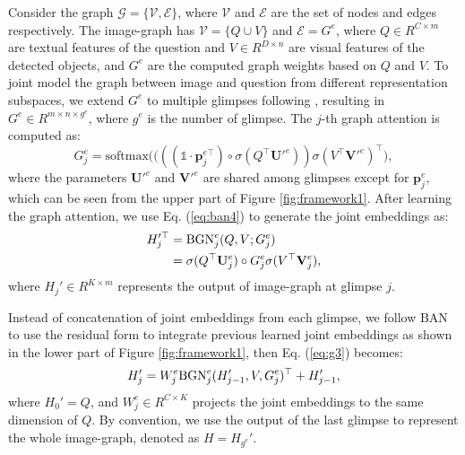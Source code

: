 \documentclass[10pt,twocolumn,letterpaper]{article}
\begin{document}
Consider the graph $\mathcal{G} = \{\mathcal{V}, \mathcal{E}\}$, where $\mathcal{V}$ and $\mathcal{E}$ are the set of nodes and edges respectively. The image-graph has $\mathcal{V}=\{Q \cup V\}$ and $\mathcal{E}=G^{e}$, where $Q \in R^{C \times m}$ are textual features of the question and $V \in R^{D \times n}$ are visual features of the detected objects, and $G^{e} $ are the computed graph weights based on $Q$ and $V$. To joint model the graph between image and question from different representation subspaces, we extend $G^{e}$ to multiple glimpses following \cite{kim2018bilinear, vaswani2017attention}, resulting in $G^{e} \in R^{m \times n \times g^e}$, where $g^e$ is the number of glimpse. The $j$-th graph attention is computed as:
\vspace{-5pt}
{\small
\begin{equation} \label{eq:g2}
G_{j}^{e} =\mathrm{softmax}\Big((((\mathds{1} \cdot \mathbf{p}_{j}^{e\top}) \circ \sigma(Q^\top\mathbf{U'}^{e})) \sigma(V^\top \mathbf{V'}^e)^\top \Big),
\end{equation}
}
where the parameters $\mathbf{U'}^e$ and $\mathbf{V'}^e$ are shared among glimpses except for $\mathbf{p}_j^e$, which can be seen from the upper part of Figure \ref{fig:framework1}. After learning the graph attention, we use Eq. (\ref{eq:ban4}) to generate the joint embeddings as:
\vspace{-5pt}
\begin{equation} \label{eq:g3}
\begin{split}
H_j'^\top &= \mathrm{BGN}^e_j(Q, V; G^e_{j}) \\
&= \sigma(Q^\top \mathbf{U}_j^e) \circ G^e_j \sigma(V^\top \mathbf{V}_j^e),
\end{split}
\vspace{-5pt}
\end{equation}
where $H_j' \in R^{K \times m}$ represents the output of image-graph at glimpse $j$.

Instead of concatenation \cite{vaswani2017attention, devlin2018bert, velickovic2017graph} of joint embeddings from each glimpse, we follow BAN to use the residual form to integrate previous learned joint embeddings as shown in the lower part of Figure \ref{fig:framework1}, then Eq. (\ref{eq:g3}) becomes:
\vspace{-5pt}
\begin{equation} \label{eq:g4}
H_j' = W^e_j\mathrm{BGN}^e_j(H_{j-1}', V, G^e_j)^\top + H_{j-1}',
\vspace{-5pt}
\end{equation}
where $H_0' = Q$, and $W^e_j \in R^{C \times K}$ projects the joint embeddings to the same dimension of $Q$. By convention, we use the output of the last glimpse to represent the whole image-graph, denoted as $H = H_{g^e}'$.
\end{document}
